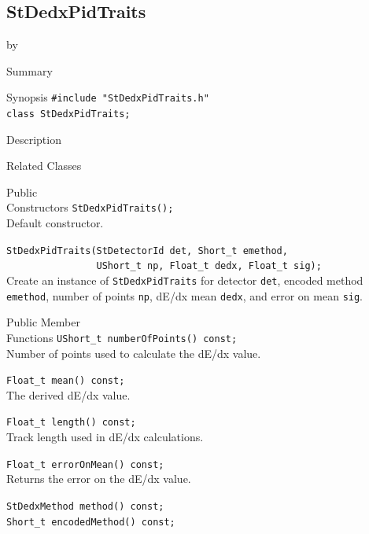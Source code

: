 \documentclass[twoside]{article}
\newcommand{\entrylabel}[1]{\mbox{\textbf{{#1}}}\hfil}%
\newenvironment{entry}
{\begin{list}{}%
    {\renewcommand{\makelabel}{\entrylabel}%
     \setlength{\labelwidth}{90pt}%
     \setlength{\leftmargin}{\labelwidth}
     \advance\leftmargin by \labelsep%
      }%
    }%
  {\end{list}}
\newcommand{\Entrylabel}[1]%
{\raisebox{0pt}[1ex][0pt]{\makebox[\labelwidth][l]%
    {\parbox[t]{\labelwidth}{\hspace{0pt}\textbf{{#1}}}}}}
\newenvironment{Entry}%
{\renewcommand{\entrylabel}{\Entrylabel}\begin{entry}}%
  {\end{entry}}
\begin{document}
\subsection{StDedxPidTraits}
\label{sec:StDedxPidTraits}
\begin{Entry}
\item[Summary]
\item[Synopsis]
    \verb+#include "StDedxPidTraits.h"+\\
    \verb+class StDedxPidTraits;+\\
\item[Description]
\item[Related Classes]
\item[Public\\ Constructors]
    \verb+StDedxPidTraits();+\\
    Default constructor.
    
    \verb+StDedxPidTraits(StDetectorId det, Short_t emethod,+\\
    \verb+                UShort_t np, Float_t dedx, Float_t sig);+\\
    Create an instance of \texttt{StDedxPidTraits} for detector
    \texttt{det}, encoded method \texttt{emethod}, number of points
    \texttt{np}, dE/dx mean \texttt{dedx}, and error on mean \texttt{sig}.
    
\item[Public Member\\ Functions]
    \verb+UShort_t numberOfPoints() const;+\\
    Number of points used to calculate the dE/dx value.
    
    \verb+Float_t mean() const;+\\
    The derived dE/dx value.

    \verb+Float_t length() const;+\\
    Track length used in dE/dx calculations.
    
    \verb+Float_t errorOnMean() const;+\\
    Returns the error on the dE/dx value.
    
    \verb+StDedxMethod method() const;+\\    

    \verb+Short_t encodedMethod() const;+\\
\end{Entry}
\clearpage
\end{document}
